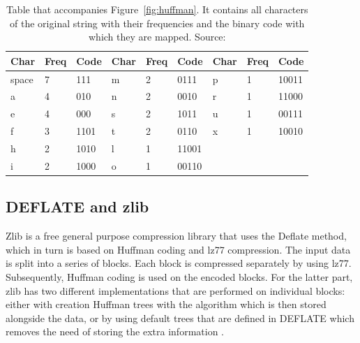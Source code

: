\begin{table}[h!]
\begin{tabular}{|lll||lll||lll|}
\hline
\textbf{Char} & \textbf{Freq} & \textbf{Code} & \textbf{Char} & \textbf{Freq} & \textbf{Code} & \textbf{Char} & \textbf{Freq} & \textbf{Code} \\ \hline
space         & 7             & 111           & m             & 2             & 0111          & p             & 1             & 10011         \\
a             & 4             & 010           & n             & 2             & 0010          & r             & 1             & 11000         \\
e             & 4             & 000           & s             & 2             & 1011          & u             & 1             & 00111         \\
f             & 3             & 1101          & t             & 2             & 0110          & x             & 1             & 10010         \\
h             & 2             & 1010          & l             & 1             & 11001         &               &               &               \\
i             & 2             & 1000          & o             & 1             & 00110         &               &               &               \\ \hline
\end{tabular}
\caption{Table that accompanies Figure~\ref{fig:huffman}. It contains all characters of the original string with their frequencies and the binary code with which they are mapped. Source: \citet{Dcoetzee2007}}
\label{tab:huff}
\end{table}



\subsection{DEFLATE and zlib}
\label{sec:zlib}
Zlib is a free general purpose compression library that uses the Deflate method, which in turn is based on Huffman coding and \ac{lz77} compression.
The input data is split into a series of blocks.
Each block is compressed separately by using \ac{lz77}.
Subsequently, Huffman coding is used on the encoded blocks.
For the latter part, zlib has two different implementations that are performed on individual blocks: either with creation Huffman trees with the algorithm which is then stored alongside the data, or by using default trees that are defined in DEFLATE which removes the need of storing the extra information \citep{zlib}.

